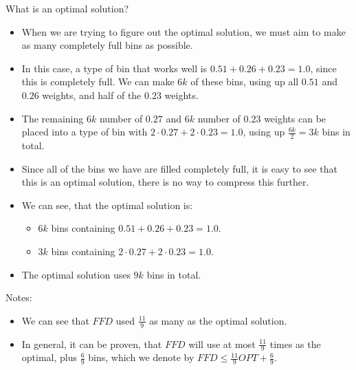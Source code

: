 What is an optimal solution?

\begin{itemize}
    \item When we are trying to figure out the optimal solution, we must aim to make as many completely full bins as possible.
    \item In this case, a type of bin that works well is $0.51+0.26+0.23=1.0$, since this is completely full. We can make $6k$ of these bins, using up all $0.51$ and $0.26$ weights, and half of the $0.23$ weights.
    \item The remaining $6k$ number of $0.27$ and $6k$ number of $0.23$ weights can be placed into a type of bin with $2\cdot{}0.27+2\cdot{}0.23=1.0$, using up $\frac{6k}{2}=3k$ bins in total.
    \item Since all of the bins we have are filled completely full, it is easy to see that this is an optimal solution, there is no way to compress this further.
    \item We can see, that the optimal solution is:
    \begin{itemize}
        \item $6k$ bins containing $0.51+0.26+0.23=1.0$.
        \item $3k$ bins containing $2\cdot{}0.27+2\cdot{}0.23=1.0$.
    \end{itemize}
    \item The optimal solution uses $9k$ bins in total.
\end{itemize}

Notes:

\begin{itemize}
    \item We can see that $FFD$ used $\frac{11}{9}$ as many as the optimal solution.
    \item In general, it can be proven, that $FFD$ will use at most $\frac{11}{9}$ times as the optimal, plus $\frac{6}{9}$ bins, which we denote by $FFD \leq{} \frac{11}{9}OPT + \frac{6}{9}$.
\end{itemize}
